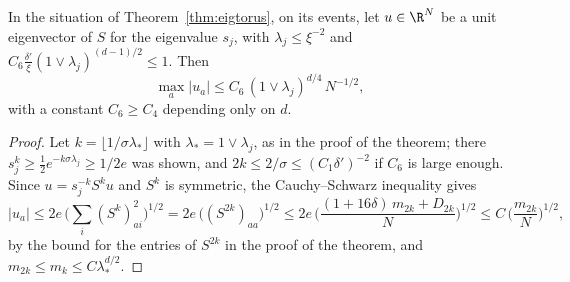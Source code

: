 \begin{corollary}\label{cor:deloc}
In the situation of Theorem~\ref{thm:eigtorus}, on its events, let $u\in\R^N$ be a unit eigenvector of $S$ for the eigenvalue $s_j$, with $\lambda_j\le\xi^{-2}$ and $C_6\frac{\delta'}\xi(1\vee\lambda_j)^{(d-1)/2}\le1$. Then
\[
\max_a|u_a|\le C_6\,(1\vee\lambda_j)^{d/4}\,N^{-1/2},
\]
with a constant $C_6\ge C_4$ depending only on $d$.
\end{corollary}

\begin{proof}
Let $k=\lfloor1/\sigma\lambda_*\rfloor$ with $\lambda_*=1\vee\lambda_j$, as in the proof of the theorem; there $s_j^k\ge\frac12e^{-k\sigma\lambda_j}\ge1/2e$ was shown, and $2k\le2/\sigma\le(C_1\delta')^{-2}$ if $C_6$ is large enough. Since $u=s_j^{-k}S^ku$ and $S^k$ is symmetric, the Cauchy--Schwarz inequality gives
\[
|u_a|\le2e\,\Big(\sum_i(S^k)_{ai}^2\Big)^{1/2}=2e\,\big((S^{2k})_{aa}\big)^{1/2}\le2e\,\Big(\frac{(1+16\delta)\,m_{2k}+D_{2k}}N\Big)^{1/2}\le C\,\Big(\frac{m_{2k}}N\Big)^{1/2},
\]
by the bound for the entries of $S^{2k}$ in the proof of the theorem, and $m_{2k}\le m_k\le C\lambda_*^{d/2}$.
\end{proof}

